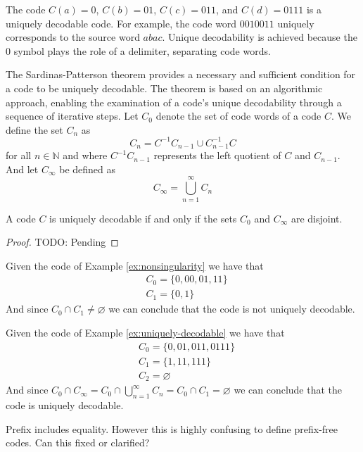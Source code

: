 \begin{example}
\label{ex:uniquely-decodable}
The code $C(a)=0$, $C(b)=01$, $C(c)=011$, and $C(d)=0111$ is a uniquely decodable code. For example, the code word $0010011$ uniquely corresponds to the source word $abac$. Unique decodability is achieved because the $0$ symbol plays the role of a delimiter, separating code words.
\end{example}

The Sardinas-Patterson theorem provides a necessary and sufficient condition for a code to be uniquely decodable. The theorem is based on an algorithmic approach, enabling the examination of a code's unique decodability through a sequence of iterative steps. Let $C_0$ denote the set of code words of a code $C$. We define the set $C_n$ as
\[
C_n = C^{-1} C_{n-1} \cup C^{-1}_{n-1} C
\]
for all $n \in \mathbb{N}$ and where $C^{-1} C_{n-1}$ represents the left quotient of $C$ and $C_{n-1}$. And let $C_\infty$ be defined as
\[
C_\infty = \bigcup^\infty_{n=1} C_n
\]

\begin{proposition}
A code $C$ is uniquely decodable if and only if the sets $C_0$ and $C_\infty$ are disjoint.
\end{proposition}
\begin{proof}
{\color{red} TODO: Pending}
\end{proof}

\begin{example}
Given the code of Example \ref{ex:nonsingularity} we have that
\begin{align*}
 & C_0 = \{0, 00, 01, 11\} \\
 & C_1 = \{0, 1\}
\end{align*}
And since $C_0 \cap C_1 \neq \varnothing$ we can conclude that the code is not uniquely decodable.

Given the code of Example \ref{ex:uniquely-decodable} we have that
\begin{align*}
 & C_0 = \{0, 01, 011, 0111\} \\
 & C_1 = \{1, 11, 111\} \\
 & C_2 = \varnothing
\end{align*}
And since $C_0 \cap C_\infty = C_0 \cap \bigcup^\infty_{n=1} C_n = C_0 \cap C_1 = \varnothing$ we can conclude that the code is uniquely decodable.
\end{example}

{\color{red} Prefix includes equality. However this is highly confusing to define prefix-free codes. Can this fixed or clarified?}

